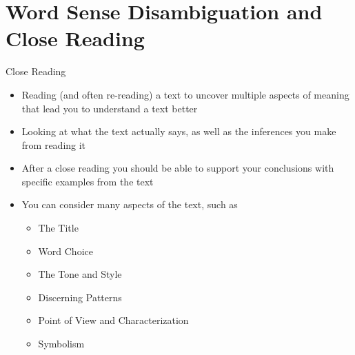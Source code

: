 
\section{Word Sense Disambiguation and Close Reading}

\begin{frame}{Close Reading}


\begin{itemize}
\item Reading (and often re-reading) a text to uncover multiple
  aspects of meaning that lead you to understand a text better
\item Looking at what the text actually says, as well as the
  inferences you make from reading it
\item After a close reading you should be able to support your
  conclusions with specific examples from the text
\item You can consider many aspects of the text, such as
  \begin{itemize}
  \item The Title
  \item Word Choice
  \item The Tone and Style
  \item Discerning Patterns
  \item  Point of View and Characterization
  \item Symbolism


\end{itemize}
\end{itemize}
\end{frame}
